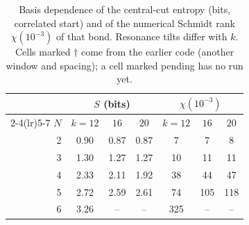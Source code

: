 \begin{table}[ht]
\centering
\small
\caption{Basis dependence of the central-cut entropy (bits, correlated start) and of the numerical Schmidt rank $\chi(10^{-3})$ of that bond. Resonance tilts differ with $k$. Cells marked $\dagger$ come from the earlier code (another window and spacing); a cell marked pending has no run yet.}
\label{tab:k}
\begin{tabular}{rcccccc}
\toprule
 & \multicolumn{3}{c}{$S$ (bits)} & \multicolumn{3}{c}{$\chi(10^{-3})$} \\
\cmidrule(lr){2-4}\cmidrule(lr){5-7}
$N$ & $k=12$ & $16$ & $20$ & $k=12$ & $16$ & $20$ \\
\midrule
2 & 0.90 & 0.87 & 0.87 & 7 & 7 & 8 \\
3 & 1.30 & 1.27 & 1.27 & 10 & 11 & 11 \\
4 & 2.33 & 2.11 & 1.92 & 38 & 44 & 47 \\
5 & 2.72 & 2.59 & 2.61 & 74 & 105 & 118 \\
6 & 3.26 & -- & -- & 325 & -- & -- \\
\bottomrule
\end{tabular}
\end{table}

